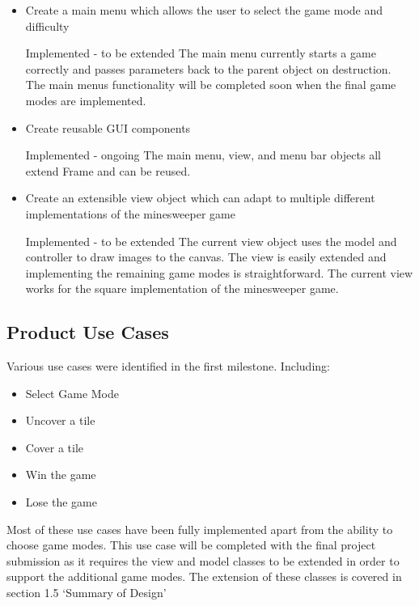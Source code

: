\documentclass[12pt, a4]{report}
\begin{document}
\begin{itemize}
	\item Create a main menu which allows the user to select the game mode and difficulty
	\par \textcolor{fawn}{Implemented - to be extended \textbar{} } The main menu currently starts a game correctly and passes parameters back to the parent object on destruction. The main menus functionality will be completed soon when the final game modes are implemented.

	\item Create reusable GUI components
	\par \textcolor{codegreen}{Implemented - ongoing \textbar{} } The main menu, view, and menu bar objects all extend Frame and can be reused.

	\item Create an extensible view object which can adapt to multiple different implementations of the minesweeper game
	\par \textcolor{fawn}{Implemented - to be extended \textbar{} } The current view object uses the model and controller to draw images to the canvas. The view is easily extended and implementing the remaining game modes is straightforward. The current view works for the square implementation of the minesweeper game.
\end{itemize}

\subsection{Product Use Cases}
\par Various use cases were identified in the first milestone. Including:
\begin{itemize}
	\item Select Game Mode
	\item Uncover a tile
	\item Cover a tile
	\item Win the game
	\item Lose the game
\end{itemize}
Most of these use cases have been fully implemented apart from the ability to choose game modes. This use case will be completed with the final project submission as it requires the view and model classes to be extended in order to support the additional game modes. The extension of these classes is covered in section 1.5 `Summary of Design'
\end{document}
